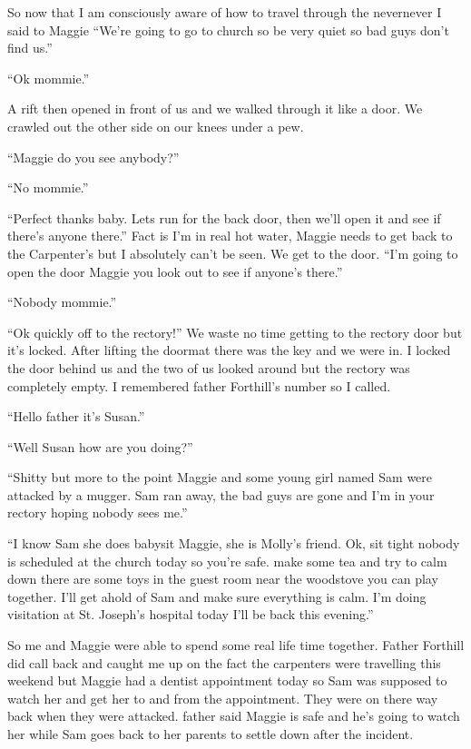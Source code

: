 So now that I am consciously aware of how to travel through the nevernever I said to Maggie ``We're going to go to church so be very quiet so bad guys don't find us.'' 

``Ok mommie.'' 

A rift then opened in front of us and we walked through it like a door. We crawled out the other side on our knees under a pew.

``Maggie do you see anybody?'' 

``No mommie.'' 

``Perfect thanks baby. Lets run for the back door, then we'll open it and see if there's anyone there.'' Fact is I'm in real hot water, Maggie needs to get back to the Carpenter's but I absolutely can't be seen. We get to the door. ``I'm going to open the door Maggie you look out to see if anyone's there.'' 

``Nobody mommie.'' 

``Ok quickly off to the rectory!'' We waste no time getting to the rectory door but it's locked. After lifting the doormat there was the key and we were in. I locked the door behind us and the two of us looked around but the rectory was completely empty. I remembered father Forthill's number so I called.

``Hello father it's Susan.''

``Well Susan how are you doing?''

``Shitty but more to the point Maggie and some young girl named Sam were attacked by a mugger. Sam ran away, the bad guys are gone and I'm in your rectory hoping nobody sees me.''

``I know Sam she does babysit Maggie, she is Molly's friend. Ok, sit tight nobody is scheduled at the church today so you're safe. make some tea and try to calm down there are some toys in the guest room near the woodstove you can play together. I'll get ahold of Sam and make sure everything is calm. I'm doing visitation at St. Joseph's hospital today I'll be back this evening.''

So me and Maggie were able to spend some real life time together. Father Forthill did call back and caught me up on the fact the carpenters were travelling this weekend but Maggie had a dentist appointment today so Sam was supposed to watch her and get her to and from the appointment. They were on there way back when they were attacked. father said Maggie is safe and he's going to watch her while Sam goes back to her parents to settle down after the incident.

